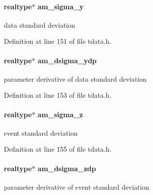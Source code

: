 \hypertarget{struct_temp_data_ac152c0012fafda7a5ec5f2163eebfcda}{}
\paragraph[{am\+\_\+sigma\+\_\+y}]{\setlength{\rightskip}{0pt plus 5cm}realtype$\ast$ am\+\_\+sigma\+\_\+y}\label{struct_temp_data_ac152c0012fafda7a5ec5f2163eebfcda}
data standard deviation 

Definition at line 151 of file tdata.\+h.

\hypertarget{struct_temp_data_a27781d18ccc799ac0074d2dc39d51abc}{}
\paragraph[{am\+\_\+dsigma\+\_\+ydp}]{\setlength{\rightskip}{0pt plus 5cm}realtype$\ast$ am\+\_\+dsigma\+\_\+ydp}\label{struct_temp_data_a27781d18ccc799ac0074d2dc39d51abc}
parameter derivative of data standard deviation 

Definition at line 153 of file tdata.\+h.

\hypertarget{struct_temp_data_a6326bdfdde6ff9d3e52a80760e403a02}{}
\paragraph[{am\+\_\+sigma\+\_\+z}]{\setlength{\rightskip}{0pt plus 5cm}realtype$\ast$ am\+\_\+sigma\+\_\+z}\label{struct_temp_data_a6326bdfdde6ff9d3e52a80760e403a02}
event standard deviation 

Definition at line 155 of file tdata.\+h.

\hypertarget{struct_temp_data_ad918e459ea613f39e2d2a2fe62b68137}{}
\paragraph[{am\+\_\+dsigma\+\_\+zdp}]{\setlength{\rightskip}{0pt plus 5cm}realtype$\ast$ am\+\_\+dsigma\+\_\+zdp}\label{struct_temp_data_ad918e459ea613f39e2d2a2fe62b68137}
parameter derivative of event standard deviation 

